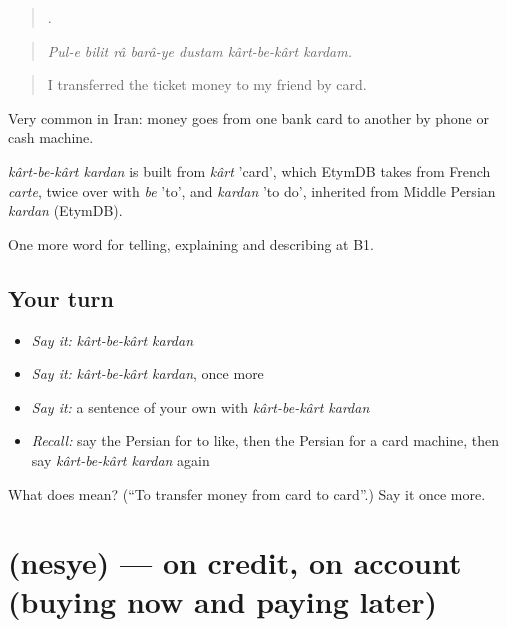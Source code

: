 \begin{quote}
        .
\end{quote}

\begin{quote}
\emph{Pul-e bilit râ barâ-ye dustam kârt-be-kârt kardam.}
\end{quote}

\begin{quote}
I transferred the ticket money to my friend by card.
\end{quote}

Very common in Iran: money goes from one bank card to another by phone or cash machine.

\begin{cousinweb}
\emph{kârt-be-kârt kardan} is built from \emph{kârt} 'card', which EtymDB takes from French \emph{carte}, twice over with \emph{be} 'to', and \emph{kardan} 'to do', inherited from Middle Persian \emph{kardan} (EtymDB).
\end{cousinweb}

\begin{grammarlens}[title={What you've built}]
One more word for telling, explaining and describing at B1.
\end{grammarlens}

\subsection*{Your turn}
\begin{itemize}
\raggedright
  \item \emph{Say it:} \emph{kârt-be-kârt kardan}
  \item \emph{Say it:} \emph{kârt-be-kârt kardan}, once more
  \item \emph{Say it:} a sentence of your own with \emph{kârt-be-kârt kardan}
  \item \emph{Recall:} say the Persian for to like, then the Persian for a card machine, then say \emph{kârt-be-kârt kardan} again
\end{itemize}

\begin{tcolorbox}[breakable,colback=teal!4,colframe=teal!35!black,title={Before you move on}]
What does     mean? (\textquotedblleft{}To transfer money from card to card\textquotedblright{}.) Say it once more.
\end{tcolorbox}
\section[\texorpdfstring{\fa{نسیه} (nesye)}{نسیه (nesye)}]{ (nesye) — on credit, on account (buying now and paying later)}

